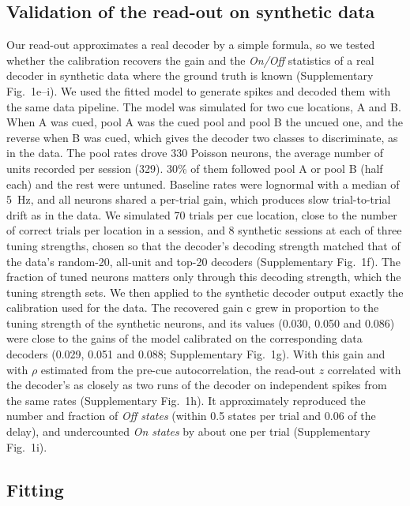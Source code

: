 \documentclass[11pt]{article}
\begin{document}
\subsection{Validation of the read-out on synthetic data}

Our read-out approximates a real decoder by a simple formula, so we tested whether the calibration recovers the gain and the \emph{On/Off} statistics of a real decoder in synthetic data where the ground truth is known (Supplementary Fig.~1e--i). We used the fitted model to generate spikes and decoded them with the same data pipeline. The model was simulated for two cue locations, A and B. When A was cued, pool A was the cued pool and pool B the uncued one, and the reverse when B was cued, which gives the decoder two classes to discriminate, as in the data. The pool rates drove 330 Poisson neurons, the average number of units recorded per session (329). 30\% of them followed pool A or pool B (half each) and the rest were untuned. Baseline rates were lognormal with a median of 5~Hz, and all neurons shared a per-trial gain, which produces slow trial-to-trial drift as in the data. We simulated 70 trials per cue location, close to the number of correct trials per location in a session, and 8 synthetic sessions at each of three tuning strengths, chosen so that the decoder's decoding strength matched that of the data's random-20, all-unit and top-20 decoders (Supplementary Fig.~1f). The fraction of tuned neurons matters only through this decoding strength, which the tuning strength sets. We then applied to the synthetic decoder output exactly the calibration used for the data. The recovered gain c grew in proportion to the tuning strength of the synthetic neurons, and its values (0.030, 0.050 and 0.086) were close to the gains of the model calibrated on the corresponding data decoders (0.029, 0.051 and 0.088; Supplementary Fig.~1g). With this gain and with $\rho$ estimated from the pre-cue autocorrelation, the read-out $z$ correlated with the decoder's as closely as two runs of the decoder on independent spikes from the same rates (Supplementary Fig.~1h). It approximately reproduced the number and fraction of \emph{Off states} (within 0.5 states per trial and 0.06 of the delay), and undercounted \emph{On states} by about one per trial (Supplementary Fig.~1i).

\subsection{Fitting}
\end{document}
